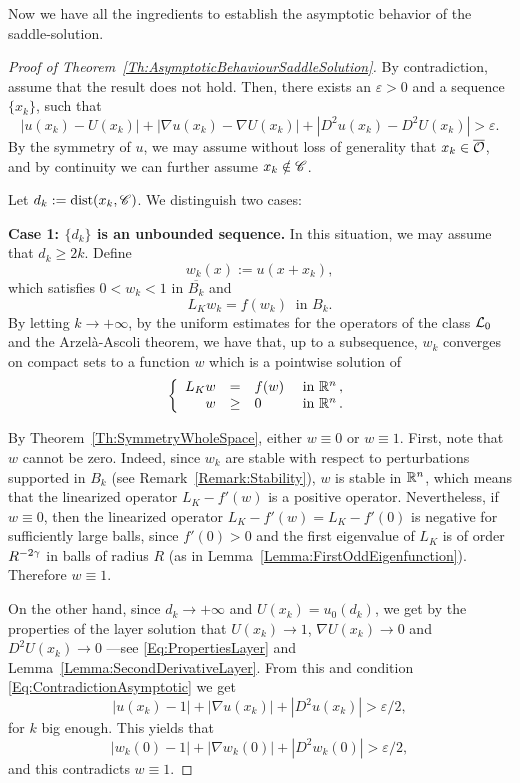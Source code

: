 Now we have all the ingredients to establish the asymptotic behavior of the saddle-solution.



\begin{proof}[Proof of Theorem~\ref{Th:AsymptoticBehaviourSaddleSolution}]
By contradiction, assume that the result does not hold. Then, there exists an $\varepsilon>0$ and a sequence $\{x_k\}$, such that
\begin{equation}
\label{Eq:ContradictionAsymptotic}
|u(x_k)-U(x_k)|+|\nabla u(x_k)-\nabla U(x_k)|+|D^2u(x_k)-D^2U(x_k)| > \varepsilon.
\end{equation}
By the symmetry of $u$, we may assume without loss of generality that $x_k \in \overline{\mathcal{O}}$, and by continuity we can further assume $ x_k \notin \mathscr{C}$. 

Let $d_k:=\operatorname{dist}(x_k,\mathscr{C})$. We distinguish two cases:

\textbf{Case 1: $\{d_k\}$ is an unbounded sequence.} In this situation, we may assume that $d_k \geq 2k$. Define
$$
w_k(x) := u(x+x_k), 
$$
which satisfies $0<w_k<1$ in $\overline{B_k}$ and
$$
L_K w_k = f(w_k) \ \textrm{ in } B_k.
$$
By letting $k\to +\infty$, by the uniform estimates for the operators of the class $\mathcal{L}_0$ and the Arzelà-Ascoli theorem, we have that, up to a subsequence, $w_k$ converges on compact sets to a function $w$ which is a pointwise solution of
$$
\left\{\begin{array}{rcll}
L_K  w &=& f(w) & \textrm{ in }\mathbb{R}^n\,,\\
w &\geq& 0 & \textrm{ in } \mathbb{R}^n\,.
\end{array} \right.
$$

By Theorem~\ref{Th:SymmetryWholeSpace}, either $w\equiv 0$ or $w\equiv 1$. First, note that $w$ cannot be zero. Indeed, since $w_k$ are stable with respect to perturbations supported in $B_k$ (see Remark~\ref{Remark:Stability}), $w$ is stable in $\mathbb{R}^n$, which means that the linearized operator $L_K-f'(w)$ is a positive operator. Nevertheless, if $w\equiv 0$, then the linearized operator $L_K-f'(w) = L_K-f'(0)$ is negative for sufficiently large balls, since $f'(0)>0$ and the first eigenvalue of $L_K$ is of order $R^{-2\gamma}$ in balls of radius $R$ (as in Lemma~\ref{Lemma:FirstOddEigenfunction}). Therefore $w\equiv 1$. 

On the other hand, since $d_k\rightarrow +\infty$ and $U(x_k) =  u_0(d_k)$, we get by the properties of the layer solution that $U(x_k) \rightarrow 1$, $\nabla U(x_k) \rightarrow 0$ and $D^2U(x_k) \rightarrow 0$ ---see \eqref{Eq:PropertiesLayer} and Lemma~\ref{Lemma:SecondDerivativeLayer}. From this and condition \eqref{Eq:ContradictionAsymptotic} we get
$$
|u(x_k)-1|+|\nabla u(x_k)|+|D^2u(x_k)| > \varepsilon/2,
$$
for $k$ big enough. This yields that 
$$
|w_k(0)-1|+|\nabla w_k(0)|+|D^2w_k(0)| > \varepsilon/2,
$$
and this contradicts $w \equiv 1$. 


\end{proof}
